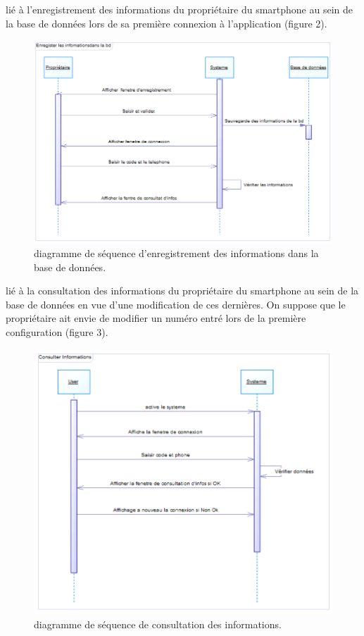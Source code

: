 \documentclass[a4paper, 12pt]{article}
\begin{document}
 lié à l’enregistrement des informations du propriétaire du smartphone au sein de la base de données lors de sa première connexion à l’application (figure 2).\\


\begin{figure}[h]
\begin{center}
\includegraphics[scale=0.5]{images7.png}
\end{center}
\caption{diagramme de séquence d’enregistrement des informations dans la base de données.}
\end{figure}

 lié à la consultation des informations du propriétaire du smartphone au sein de la base de données en vue d’une
modification de ces dernières. On suppose que le propriétaire ait envie de modifier un numéro entré lors de la première configuration (figure 3).\\




\begin{figure}[h]
\begin{center}
\includegraphics[scale=0.5]{images5.png}
\end{center}
\caption{diagramme de séquence de consultation des informations.}
\end{figure}
\end{document}
